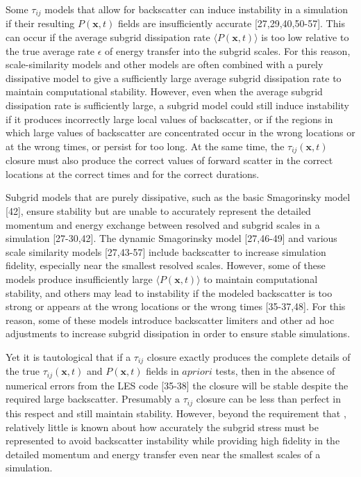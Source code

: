 Some  $\tau_{ij}$  models that allow for backscatter can induce instability in a simulation if their resulting  $P(\mathbf{x},t)$  fields are insufficiently accurate [27,29,40,50-57]. This can occur if the average subgrid dissipation rate  $\langle P(\mathbf{x},t)\rangle$  is too low relative to the true average rate  $\epsilon$  of energy transfer into the subgrid scales. For this reason, scale-similarity models and other models are often combined with a purely dissipative model to give a sufficiently large average subgrid dissipation rate to maintain computational stability. However, even when the average subgrid dissipation rate is sufficiently large, a subgrid model could still induce instability if it produces incorrectly large local values of backscatter, or if the regions in which large values of backscatter are concentrated occur in the wrong locations or at the wrong times, or persist for too long. At the same time, the  $\tau_{ij}(\mathbf{x},t)$  closure must also produce the correct values of forward scatter in the correct locations at the correct times and for the correct durations. 

Subgrid models that are purely dissipative, such as the basic Smagorinsky model [42], ensure stability but are unable to accurately represent the detailed momentum and energy exchange between resolved and subgrid scales in a simulation [27-30,42]. The dynamic Smagorinsky model [27,46-49] and various scale similarity models [27,43-57] include backscatter to increase simulation fidelity, especially near the smallest resolved scales. However, some of these models produce insufficiently large  $\langle P(\mathbf{x},t)\rangle$   to maintain computational stability, and others may lead to instability if the modeled backscatter is too strong or appears at the wrong locations or the wrong times [35-37,48]. For this reason, some of these models introduce backscatter limiters and other ad hoc adjustments to increase subgrid dissipation in order to ensure stable simulations.

Yet it is tautological that if a $\tau_{ij}$ closure exactly produces the complete details of the true  $\tau_{ij}(\mathbf{x},t)$  and  $P(\mathbf{x},t)$  fields in  $a priori$  tests, then in the absence of numerical errors from the LES code [35-38] the closure will be stable despite the required large backscatter. Presumably a  $\tau_{ij}$   closure can be less than perfect in this respect and still maintain stability. However, beyond the requirement that  , relatively little is known about how accurately the subgrid stress   must be represented to avoid backscatter instability while providing high fidelity in the detailed momentum and energy transfer even near the smallest scales of a simulation.

